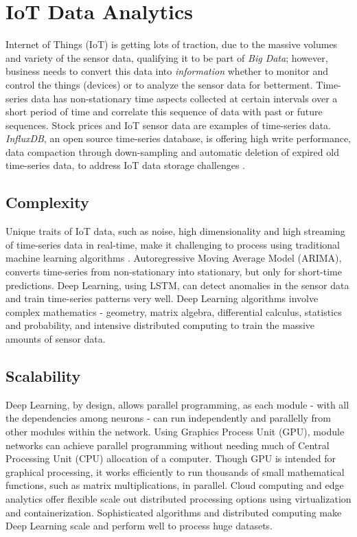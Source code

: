 \documentclass[sigconf]{acmart}
\begin{document}
	
	\section{IoT Data Analytics}
	
	Internet of Things (IoT) is getting lots of traction, due to the massive volumes and variety of the sensor data, qualifying it to be part of {\em Big Data}; however, business needs to convert this data into {\em information} whether to monitor and control the things (devices) or to analyze the sensor data for betterment. Time-series data has non-stationary time aspects collected at certain intervals over a short period of time and correlate this sequence of data with past or future sequences. Stock prices and IoT sensor data are examples of time-series data. {\em InfluxDB}, an open source time-series database, is offering high write performance, data compaction through down-sampling and automatic deletion of expired old time-series data, to address IoT data storage challenges \cite{Influx}.	
	
	
	\subsection{Complexity}
	
	Unique traits of IoT data, such as noise, high dimensionality and high streaming of time-series data in real-time, make it challenging to process using traditional machine learning algorithms \cite{Sampathkumar2016}. Autoregressive Moving Average Model (ARIMA), converts time-series from non-stationary into stationary, but only for short-time predictions. Deep Learning, using LSTM, can detect anomalies in the sensor data and train time-series patterns very well. Deep Learning algorithms involve complex mathematics - geometry, matrix algebra, differential calculus, statistics and probability, and intensive distributed computing to train the massive amounts of sensor data.
	
	\subsection{Scalability}
	
	Deep Learning, by design, allows parallel programming, as each module - with all the dependencies among neurons - can run independently and parallelly from other modules within the network. Using Graphics Process Unit (GPU), module networks can achieve parallel programming without needing much of Central Processing Unit (CPU) allocation of a computer. Though GPU is intended for graphical processing, it works efficiently to run thousands of small mathematical functions, such as matrix multiplications, in parallel. Cloud computing and edge analytics offer flexible scale out distributed processing options using virtualization and containerization. Sophisticated algorithms and distributed computing make Deep Learning scale and perform well to process huge datasets. 
	
\end{document}

